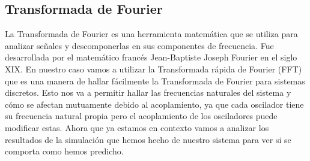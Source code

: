 \documentclass{article}
\begin{document}
\subsection{Transformada de Fourier}
La Transformada de Fourier es una herramienta matemática que se utiliza para analizar señales y descomponerlas en sus componentes de frecuencia. Fue desarrollada por el matemático francés Jean-Baptiste Joseph Fourier en el siglo XIX.\newline\linebreak
En nuestro caso vamos a utilizar la Transformada rápida de Fourier (FFT) que es una manera de hallar fácilmente la Transformada de Fourier para sistemas discretos. Esto nos va a permitir hallar las frecuencias naturales del sistema y cómo se afectan mutuamente debido al acoplamiento, ya que cada oscilador tiene su frecuencia natural propia pero el acoplamiento de los osciladores puede modificar estas.\newline\linebreak
Ahora que ya estamos en contexto vamos a analizar los resultados de la simulación que hemos hecho de nuestro sistema para ver si se comporta como hemos predicho.
\end{document}
